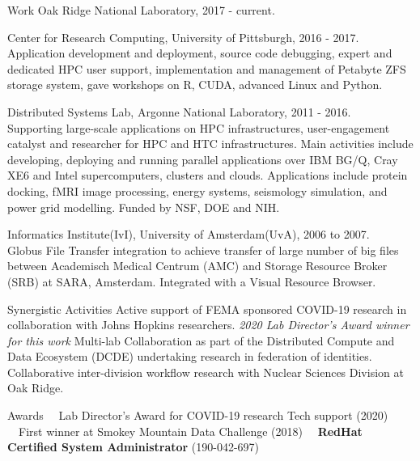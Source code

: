 \documentclass[11pt]{resume}
\begin{document}
\begin{category}{Work}
 Oak Ridge National Laboratory, 2017 - current.

 Center for Research Computing, University of Pittsburgh, 2016 - 2017.
Application development and deployment, source code debugging, expert and dedicated HPC user support,
implementation and management of Petabyte ZFS storage system, gave workshops on R, CUDA, advanced Linux and Python.

 Distributed Systems Lab, Argonne National
Laboratory, 2011 - 2016.\\
Supporting large-scale applications on HPC infrastructures, user-engagement
catalyst and researcher for HPC and HTC infrastructures. Main activities
include developing, deploying and running parallel applications over IBM BG/Q,
Cray XE6 and Intel supercomputers, clusters and clouds. Applications
include protein docking, fMRI image processing, energy systems,
seismology simulation, and power grid modelling. Funded by NSF, DOE and
NIH.

 Informatics Institute(IvI), University of
Amsterdam(UvA), 2006 to 2007.\\
Globus File Transfer integration to
achieve transfer of large number of big files between Academisch Medical
Centrum (AMC) and Storage Resource Broker (SRB) at SARA, Amsterdam. Integrated
with a Visual Resource Browser.

\end{category}

\begin{category}{Synergistic Activities}
 Active support of FEMA sponsored COVID-19 research in collaboration with Johns Hopkins researchers. \emph{2020 Lab Director's Award winner for this work}
 Multi-lab Collaboration as part of the Distributed Compute and Data Ecosystem (DCDE) undertaking research in federation of identities. 
 Collaborative inter-division workflow research with Nuclear Sciences Division at Oak Ridge.
\end{category}

\begin{category}{Awards}
\citembullet~~Lab Director's Award for COVID-19 research Tech support (2020)
\citembullet~~First winner at Smokey Mountain Data Challenge (2018)
\citembullet~~\textbf{RedHat Certified System Administrator} (190-042-697)
\end{category}
\end{document}
